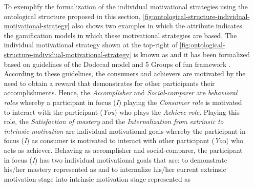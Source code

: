 To exemplify the formalization of the individual motivational strategies using the ontological structure proposed in this section, \autoref{fig:ontological-structure-individual-motivational-strategy} also shows two examples in which the attribute  indicates the gamification models in which these motivational strategies are based. The individual motivational strategy shown at the top-right of \autoref{fig:ontological-structure-individual-motivational-strategy} is known as  and it has been formalized based on guidelines of the Dodecad model \cite{Marczewski2015a} and 5 Groups of fun framework \cite{Marczewski2015b}. According to these guidelines, the consumers and achievers are motivated by the need to obtain a reward that demonstrates for other participants their accomplishments. Hence, the \emph{Accomplisher} and \emph{Social-comparer} are \emph{behavioral roles} whereby a participant in focus (\emph{I}) playing the \emph{Consumer role} is motivated to interact with the participant (\emph{You}) who plays the \emph{Achieve role}. Playing this role, the \emph{Satisfaction of mastery} and the \emph{Internalization from extrinsic to intrinsic motivation} are individual motivational goals whereby the participant in focus (\emph{I}) as consumer is motivated to interact with other participant (\emph{You}) who acts as achiever. Behaving as accomplisher and social-comparer, the participant in focus (\emph{I}) has two individual motivational goals that are: to demonstrate his/her mastery represented as  and to internalize his/her current extrinsic motivation stage into intrinsic motivation stage represented as 

